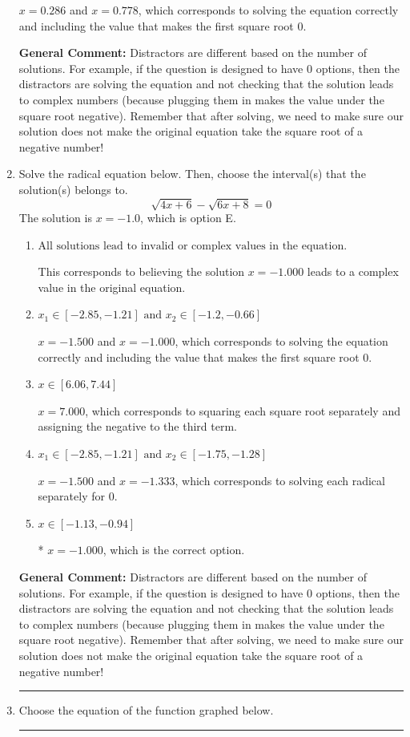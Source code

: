 \documentclass{extbook}[14pt]
\newcommand{\litem}[1]{\item #1

\rule{\textwidth}{0.4pt}}
\begin{document}
\begin{enumerate}
{\begin{enumerate}[label=\Alph*.]
$x = 0.286$ and $x = 0.778$, which corresponds to solving the equation correctly and including the value that makes the first square root 0.
\end{enumerate}

\textbf{General Comment:} Distractors are different based on the number of solutions. For example, if the question is designed to have 0 options, then the distractors are solving the equation and not checking that the solution leads to complex numbers (because plugging them in makes the value under the square root negative). Remember that after solving, we need to make sure our solution does not make the original equation take the square root of a negative number!
}
\litem{
Solve the radical equation below. Then, choose the interval(s) that the solution(s) belongs to.
\[ \sqrt{4 x + 6} - \sqrt{6 x + 8} = 0 \]The solution is \( x = -1.0 \), which is option E.\begin{enumerate}[label=\Alph*.]
\item \( \text{All solutions lead to invalid or complex values in the equation.} \)

This corresponds to believing the solution $x = -1.000$ leads to a complex value in the original equation.
\item \( x_1 \in [-2.85, -1.21] \text{ and } x_2 \in [-1.2,-0.66] \)

$x = -1.500$ and $x = -1.000$, which corresponds to solving the equation correctly and including the value that makes the first square root 0.
\item \( x \in [6.06,7.44] \)

$x = 7.000$, which corresponds to squaring each square root separately and assigning the negative to the third term.
\item \( x_1 \in [-2.85, -1.21] \text{ and } x_2 \in [-1.75,-1.28] \)

$x = -1.500$ and $x = -1.333$, which corresponds to solving each radical separately for 0.
\item \( x \in [-1.13,-0.94] \)

* $x = -1.000$, which is the correct option.
\end{enumerate}

\textbf{General Comment:} Distractors are different based on the number of solutions. For example, if the question is designed to have 0 options, then the distractors are solving the equation and not checking that the solution leads to complex numbers (because plugging them in makes the value under the square root negative). Remember that after solving, we need to make sure our solution does not make the original equation take the square root of a negative number!
}
\litem{
Choose the equation of the function graphed below.

}
\end{enumerate}
\end{document}
